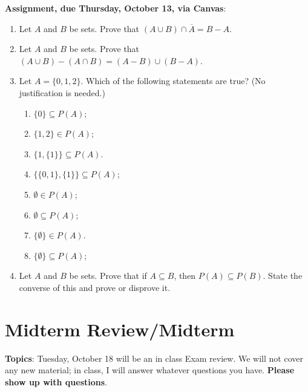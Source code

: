 \documentclass[12pt]{article}
\begin{document}
\noindent \textbf{Assignment, due Thursday, October 13, via Canvas}:

\begin{enumerate}
\item Let $A$ and $B$ be sets. Prove that $(A \cup B) \cap \overline{A} = B - A$.
\item Let $A$ and $B$ be sets. Prove that $(A \cup B) - (A \cap B) = (A - B) \cup (B - A)$.
\item Let $A = \{0,1,2\}$. Which of the following statements are true? (No justification is needed.)

 \begin{enumerate}
 \item $\{0\} \subseteq P(A)$;\vspace{0.3cm}
 \item $\{1,2\} \in P(A)$;\vspace{0.3cm}
 \item $\{1,\{1\}\} \subseteq P(A)$.\\ 
 \item $\{\{0,1\},\{1\}\} \subseteq P(A)$;\vspace{0.3cm}
 \item $\emptyset \in P(A)$;\vspace{0.3cm}
 \item $\emptyset \subseteq P(A)$;\vspace{0.3cm}
 \item $\{\emptyset\} \in P(A)$. \vspace{0.3cm}
 \item $\{\emptyset\} \subseteq P(A)$;\vspace{0.3cm}

 \end{enumerate}
\item Let $A$ and $B$ be sets. Prove that if $A \subseteq B$, then $P(A) \subseteq P(B)$. State the converse of this and prove or disprove it.

\end{enumerate}


\newpage
\section[ (October 18/20) Midterm Review/Midterm]{Midterm Review/Midterm}

\textbf{Topics}: Tuesday, October 18 will be an in class Exam review. We will not cover any new material; in class, I will answer whatever questions you have. \textbf{Please show up with questions}.
\end{document}
